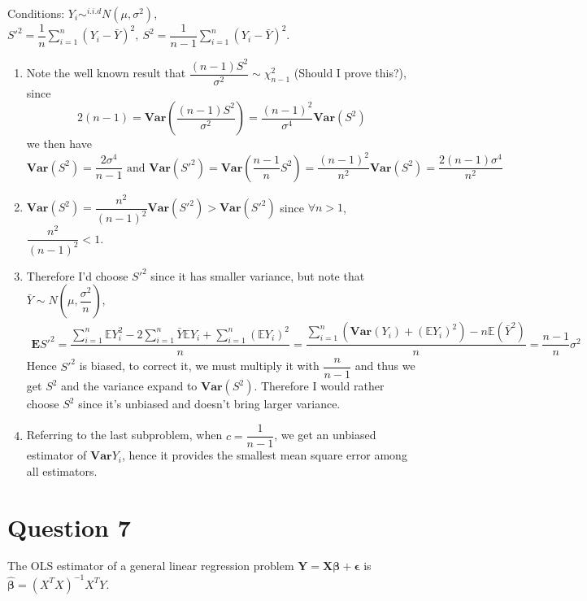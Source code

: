 \documentclass[12pt]{article}
\begin{document}
Conditions: $Y_i\sim^{i.i.d} N(\mu,\sigma^2)$, $\displaystyle S'^2=\dfrac{1}{n}\sum_{i=1}^n(Y_i-\bar{Y})^2,\ S^2=\dfrac{1}{n-1}\sum_{i=1}^n(Y_i-\bar{Y})^2$.

\begin{enumerate}
    \item Note the well known result that $\dfrac{(n-1)S^2}{\sigma^2}\sim\chi_{n-1}^2$ (Should I prove this?), since 
    \begin{equation}2(n-1)=\mathbf{Var}(\dfrac{(n-1)S^2}{\sigma^2})=\dfrac{(n-1)^2}{\sigma^4}\mathbf{Var}(S^2)\end{equation}
    we then have 
    \begin{equation}\mathbf{Var}(S^2)=\dfrac{2\sigma^4}{n-1}\text{ and } \mathbf{Var}(S'^2)=\mathbf{Var}(\dfrac{n-1}{n}S^2)=\dfrac{(n-1)^2}{n^2}\mathbf{Var}(S^2)=\dfrac{2(n-1)\sigma^4}{n^2}
    \end{equation}
    \item $\mathbf{Var}(S^2)=\dfrac{n^2}{(n-1)^2}\mathbf{Var}(S'^2)>\mathbf{Var}(S'^2)$ since $\forall n>1$, $\dfrac{n^2}{(n-1)^2}<1$.
    \item Therefore I'd choose $S'^2$ since it has smaller variance, but note that $\bar{Y}\sim N(\mu,\dfrac{\sigma^2}{n})$, 
    \begin{align*}
        \mathbf{E}S'^2=\dfrac{\displaystyle\sum_{i=1}^n \mathbb{E}Y_i^2-2\sum_{i=1}^{n}\bar{Y}\mathbb{E}Y_i+\sum_{i=1}^{n}(\mathbb{E}Y_i)^2}{n}=\dfrac{\displaystyle\sum_{i=1}^{n}(\mathbf{Var}(Y_i)+(\mathbb{E}Y_i)^2)-n \mathbb{E}(\bar{Y}^2)}{n}=\dfrac{n-1}{n}\sigma^2
    \end{align*}
    Hence $S'^2$ is biased, to correct it, we must multiply it with $\dfrac{n}{n-1}$ and thus we get $S^2$ and the variance expand to $\mathbf{Var}(S^2)$. Therefore I would rather choose $S^2$ since it's unbiased and doesn't bring larger variance.
    \item Referring to the last subproblem, when $c=\dfrac{1}{n-1}$, we get an unbiased estimator of $\mathbf{Var}Y_i$, hence it provides the smallest mean square error among all estimators. 
\end{enumerate}

\section{Question 7}

The OLS estimator of a general linear regression problem $\mathbf{Y}=\mathbf{X\beta} +\mathbf{\epsilon}$ is $\hat{\mathbf{\beta}}=(X^TX)^{-1}X^TY$. 
\end{document}
